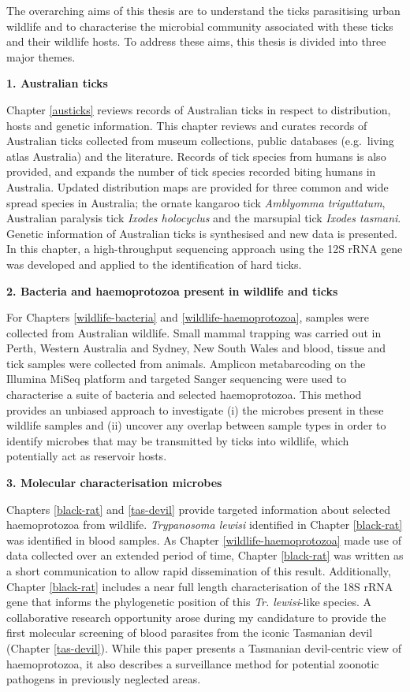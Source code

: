 \documentclass[a4paper, nobind]{templates/ociamthesis}
\begin{document}
The overarching aims of this thesis are to understand the ticks parasitising urban wildlife and to characterise the microbial community associated with these ticks and their wildlife hosts. To address these aims, this thesis is divided into three major themes.

\textbf{1. Australian ticks}

Chapter \ref{austicks} reviews records of Australian ticks in respect to distribution, hosts and genetic information.
This chapter reviews and curates records of Australian ticks collected from museum collections, public databases (e.g.~living atlas Australia) and the literature.
Records of tick species from humans is also provided, and expands the number of tick species recorded biting humans in Australia.
Updated distribution maps are provided for three common and wide spread species in Australia; the ornate kangaroo tick \emph{Amblyomma triguttatum}, Australian paralysis tick \emph{Ixodes holocyclus} and the marsupial tick \emph{Ixodes tasmani}.
Genetic information of Australian ticks is synthesised and new data is presented.
In this chapter, a high-throughput sequencing approach using the 12S rRNA gene was developed and applied to the identification of hard ticks.

\textbf{2. Bacteria and haemoprotozoa present in wildlife and ticks}

For Chapters \ref{wildlife-bacteria} and \ref{wildlife-haemoprotozoa}, samples were collected from Australian wildlife.
Small mammal trapping was carried out in Perth, Western Australia and Sydney, New South Wales and blood, tissue and tick samples were collected from animals.
Amplicon metabarcoding on the Illumina MiSeq platform and targeted Sanger sequencing were used to characterise a suite of bacteria and selected haemoprotozoa.
This method provides an unbiased approach to investigate (i) the microbes present in these wildlife samples and (ii) uncover any overlap between sample types in order to identify microbes that may be transmitted by ticks into wildlife, which potentially act as reservoir hosts.

\textbf{3. Molecular characterisation microbes}

Chapters \ref{black-rat} and \ref{tas-devil} provide targeted information about selected haemoprotozoa from wildlife.
\emph{Trypanosoma lewisi} identified in Chapter \ref{black-rat} was identified in blood samples.
As Chapter \ref{wildlife-haemoprotozoa} made use of data collected over an extended period of time, Chapter \ref{black-rat} was written as a short communication to allow rapid dissemination of this result.
Additionally, Chapter \ref{black-rat} includes a near full length characterisation of the 18S rRNA gene that informs the phylogenetic position of this \emph{Tr. lewisi}-like species.
A collaborative research opportunity arose during my candidature to provide the first molecular screening of blood parasites from the iconic Tasmanian devil (Chapter \ref{tas-devil}).
While this paper presents a Tasmanian devil-centric view of haemoprotozoa, it also describes a surveillance method for potential zoonotic pathogens in previously neglected areas.
\end{document}
